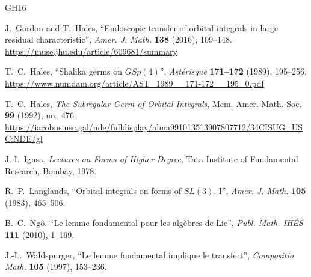 \documentclass[11pt,letterpaper]{article}
\begin{document}
\begin{thebibliography}{GH16}

J.~Gordon and T.~Hales, ``Endoscopic transfer of orbital integrals in large residual characteristic'', \emph{Amer. J. Math.} \textbf{138} (2016), 109--148. \url{https://muse.jhu.edu/article/609681/summary}

T.~C.~Hales, ``Shalika germs on $GSp(4)$'', \emph{Ast\'erisque} \textbf{171--172} (1989), 195--256. \url{https://www.numdam.org/article/AST_1989__171-172__195_0.pdf}

T.~C.~Hales, \emph{The Subregular Germ of Orbital Integrals}, Mem. Amer. Math. Soc. \textbf{99} (1992), no.~476. \url{https://iacobus.usc.gal/nde/fulldisplay/alma991013513907807712/34CISUG_USC:NDE/gl}

J.-I.~Igusa, \emph{Lectures on Forms of Higher Degree}, Tata Institute of Fundamental Research, Bombay, 1978.

R.~P.~Langlands, ``Orbital integrals on forms of $SL(3)$, I'', \emph{Amer. J. Math.} \textbf{105} (1983), 465--506.

B.~C.~Ng\^o, ``Le lemme fondamental pour les alg\`ebres de Lie'', \emph{Publ. Math. IH\'ES} \textbf{111} (2010), 1--169.

J.-L.~Waldspurger, ``Le lemme fondamental implique le transfert'', \emph{Compositio Math.} \textbf{105} (1997), 153--236.

\end{thebibliography}
\end{document}
